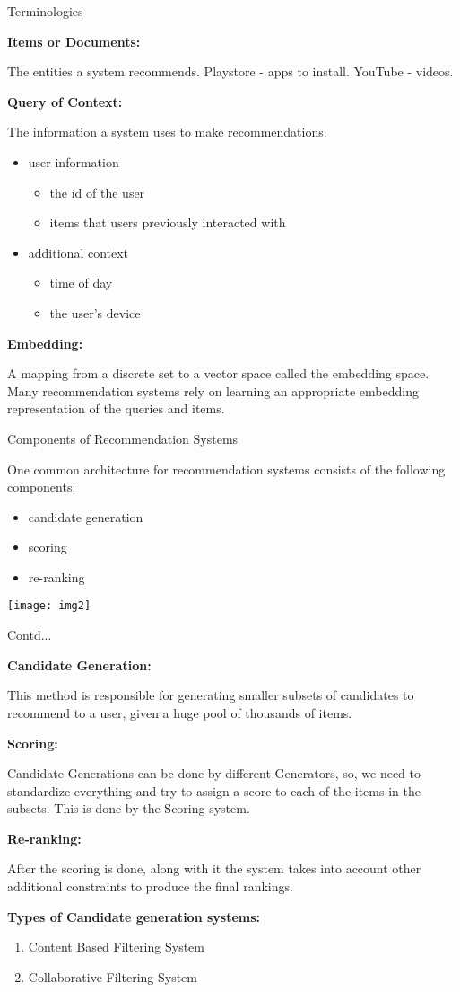 \documentclass{beamer}
\newcommand\myheading[1]{%
  \par\bigskip
  {\large\bfseries#1}\par\smallskip}
\begin{document}
\begin{frame}{Terminologies}
\begin{flushleft}
	\myheading{Items or Documents:}
		The entities a system recommends. Playstore - apps to install. YouTube - videos.
	\myheading{Query of Context:}
	The information a system uses to make recommendations.
	\begin{itemize}
		\item user information
		\begin{itemize}
			\item the id of the user
			\item items that users previously interacted with
		\end{itemize}
		\item additional context
		\begin{itemize}
			\item time of day
			\item the user's device
		\end{itemize}
	\end{itemize}
	\myheading{Embedding:}
	A mapping from a discrete set to a vector space called the embedding space. Many recommendation systems rely on learning an appropriate embedding representation of the queries and items.
\end{flushleft}
\end{frame}

\begin{frame}{Components of Recommendation Systems}
	\begin{flushleft}
		One common architecture for recommendation systems consists of the following components:
		\begin{itemize}
			\item candidate generation
			\item scoring
			\item re-ranking
		\end{itemize}
\end{flushleft}
\texttt{[image: img2]}
\end{frame}

\begin{frame}{Contd...}
	\begin{flushleft}
		\myheading{Candidate Generation:}
		This method is responsible for generating smaller subsets of candidates to recommend to a user, given a huge pool of thousands of items.
		\myheading{Scoring:}
		Candidate Generations can be done by different Generators, so, we need to standardize everything and try to assign a score to each of the items in the subsets. This is done by the Scoring system.
		\myheading{Re-ranking:}
		After the scoring is done, along with it the system takes into account other additional constraints to produce the final rankings.
		\myheading{Types of Candidate generation systems:}
		\begin{enumerate}
			\item Content Based Filtering System
			\item Collaborative Filtering System
		\end{enumerate}
	\end{flushleft}	
\end{frame}
\end{document}

